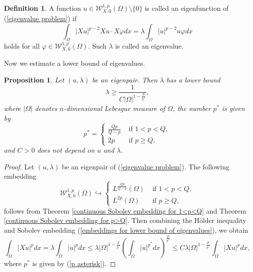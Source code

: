 \documentclass[a4paper,12pt,reqno]{amsart}
\renewcommand\eqref[1]{(\ref{#1})} %
\numberwithin{equation}{section}
\theoremstyle{plain}
\newtheorem{proposition}[theorem]{Proposition}
\theoremstyle{definition}
\newtheorem{definition}[theorem]{Definition}
\begin{document}
\begin{definition}\label{def:eigenfunction}
A  function $u \in \mathcal{W}_{X,0}^{1, p}(\Omega)\setminus \{0\}$ is called an eigenfunction of  \eqref{eigenvalue problem} if
\begin{equation}\label{eigenfunction}
\int_{\Omega}|X u|^{p-2} Xu \cdot X \varphi d x=\lambda \int_{\Omega}|u|^{p-2} u \varphi d x
\end{equation}
holds for all $\varphi\in \mathcal{W}_{X,0}^{1, p}(\Omega)$. Such $\lambda$ is called an eigenvalue.
\end{definition}
Now we estimate a lower bound of eigenvalues.
\begin{proposition} \label{lower bound lemma}
Let $(u, \lambda)$ be an eigenpair. Then $\lambda$ has a lower bound
\begin{equation*}
\lambda \geq  \frac{1}{C|\Omega|^{1-\frac{p}{p^{*}}}}, 
\end{equation*}
where $|\Omega|$ denotes $n$-dimensional Lebesgue measure of $\Omega$, the number $p^{*}$ is given by  
\begin{equation}\label{p asterisk}
p^{*}=\begin{cases}
\frac{Qp}{Q-p}& \text{ if } 1<p<Q,\\
2p& \text{ if } p\geq Q,
\end{cases}
\end{equation}
and $C>0$ does not depend on  $u$ and  $\lambda$.
\end{proposition}
\begin{proof}
Let $(u,\lambda)$ be an eigenpair of  \eqref{eigenvalue problem}. The following  embedding
\begin{equation}\label{embeddings for lower bound of eigenvalues}
\mathcal{W}_{X,0}^{1, p}(\Omega)\hookrightarrow\begin{cases}
L^{\frac{Qp}{Q-p}}(\Omega) & \text{ if } 1<p<Q,\\
L^{2p}(\Omega) & \text{ if } p\geq Q,
\end{cases}
\end{equation}
follows from Theorem \ref{continuous Sobolev embedding for 1<p<Q} and Theorem \ref{continuous Sobolev embedding for p>Q}. Then combining the H\"older inequality and  Sobolev embedding \eqref{embeddings for lower bound of eigenvalues}, we obtain
\begin{equation*}
\int_{\Omega}|X u|^{p} d x= \lambda\int_{\Omega}|u|^{p} d x\leq \lambda|\Omega|^{1-\frac{p}{p^{*}}}\left(\int_{\Omega}|u|^{p^{*}}dx\right)^{\frac{p}{p^{*}}}\leq C\lambda|\Omega|^{1-\frac{p}{p^{*}}}\int_{\Omega}|X u|^{p} d x ,
\end{equation*}
where $p^{*}$ is given by \eqref{p asterisk}.
\end{proof}
\end{document}

